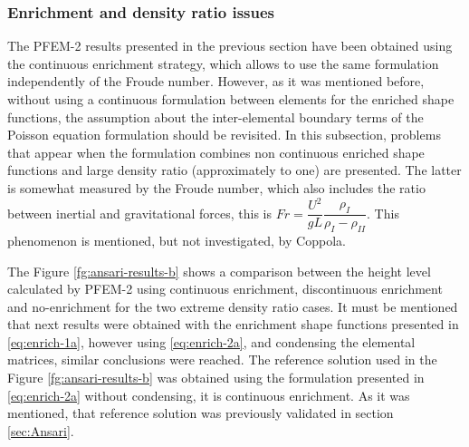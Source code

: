 \subsubsection{Enrichment and density ratio issues}

The PFEM-2 results presented in the previous section have been obtained using the continuous enrichment strategy, which allows to use the same formulation independently of the Froude number. However, as it was mentioned before, without using a continuous formulation between elements for the enriched shape functions, the assumption about the inter-elemental boundary terms of the Poisson equation formulation should be revisited. In this subsection, problems that appear when the formulation combines non continuous enriched shape functions and large density ratio (approximately to one) are presented. The latter is somewhat measured by the Froude number, which also includes the ratio between inertial and gravitational forces, this is $Fr = \dfrac{U^2}{gL}\dfrac{\rho_I}{\rho_I-\rho_{II}}$. This phenomenon is mentioned, but not investigated, by Coppola\cite{Coppola05}.

The Figure \ref{fg:ansari-results-b} shows a comparison between the height level calculated by PFEM-2 using continuous enrichment, discontinuous enrichment and no-enrichment for the two extreme density ratio cases. It must be mentioned that next results were obtained with the enrichment shape functions presented in \ref{eq:enrich-1a}, however using \ref{eq:enrich-2a}, and condensing the elemental matrices, similar conclusions were reached. The reference solution used in the Figure \ref{fg:ansari-results-b} was obtained using the formulation presented in \ref{eq:enrich-2a} without condensing, it is continuous enrichment. As it was mentioned, that reference solution was previously validated in section \ref{sec:Ansari}.


